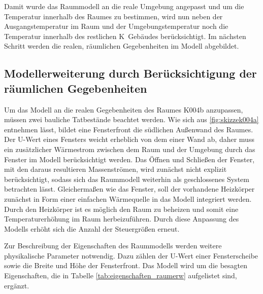 Damit wurde das Raummodell an die reale Umgebung angepasst und um die Temperatur innerhalb des Raumes zu bestimmen, wird nun neben der Ausgangstemperatur im Raum und der Umgebungstemperatur noch die Temperatur innerhalb des restlichen K~Gebäudes berücksichtigt. Im nächsten Schritt werden die realen, räumlichen Gegebenheiten im Modell abgebildet.


\subsection{Modellerweiterung durch Berücksichtigung der räumlichen Gegebenheiten}

Um das Modell an die realen Gegebenheiten des Raumes K004b anzupassen, müssen zwei bauliche Tatbestände beachtet werden. Wie sich aus \ref{fig:skizzek004a} entnehmen lässt, bildet eine Fensterfront die südlichen Außenwand des Raumes. Der U-Wert eines Fensters weicht erheblich von dem einer Wand ab, daher muss ein zusätzlicher Wärmestrom zwischen dem Raum und der Umgebung durch das Fenster im Modell berücksichtigt werden. Das Öffnen und Schließen der Fenster, mit den daraus resultieren Massenströmen, wird zunächst nicht explizit berücksichtigt, sodass  sich das Raummodell weiterhin als geschlossenes System betrachten lässt. 
Gleichermaßen wie das Fenster, soll der vorhandene Heizkörper zunächst in Form einer einfachen Wärmequelle in das Modell integriert werden. Durch den Heizkörper ist es möglich den Raum zu beheizen und somit eine Temperaturerhöhung im Raum herbeizuführen. Durch diese Anpassung des Modells erhöht sich die Anzahl der Steuergrößen erneut. 

Zur Beschreibung der Eigenschaften des Raummodells werden weitere physikalische Parameter notwendig. Dazu zählen der U-Wert einer Fensterscheibe sowie die Breite und Höhe der Fensterfront. Das Modell wird um die besagten Eigenschaften, die in Tabelle \ref{tab:eigenschaften_raumerw} aufgelistet sind, ergänzt.

